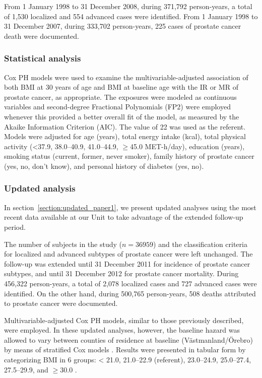 From 1 January 1998 to 31 December 2008, during 371,792 person-years, a total of 1,530 localized and 554 advanced cases were identified. From 1 January 1998 to 31 December 2007, during 333,702 person-years, 225 cases of prostate cancer death were documented.

\subsubsection{Statistical analysis}

Cox PH models were used to examine the multivariable-adjusted association of both BMI at 30 years of age and BMI at baseline age with the IR or MR of prostate cancer, as appropriate. The exposures were modeled as continuous variables and second-degree Fractional Polynomials (FP2) \citep{royston_use_1999} were employed whenever this provided a better overall fit of the model, as measured by the Akaike Information Criterion (AIC). The value of 22 \kgmsq{} was used as the referent. Models were adjusted for age (years), total energy intake (kcal), total physical activity (<37.9, 38.0--40.9, 41.0--44.9, $\ge$45.0 MET-h/day), education (years), smoking status (current, former, never smoker), family history of prostate cancer (yes, no, don't know), and personal history of diabetes (yes, no).

\subsubsection{Updated analysis}

In section~\ref{section:updated_paper1}, we present updated analyses using the most recent data available at our Unit to take advantage of the extended follow-up period.  

The number of subjects in the study ($n=36959$) and the classification criteria for localized and advanced subtypes of prostate cancer were left unchanged. The follow-up was extended until 31 December 2011 for incidence of prostate cancer subtypes, and until 31 December 2012 for prostate cancer mortality. During 456,322 person-years, a total of 2,078 localized cases and 727 advanced cases were identified. On the other hand, during 500,765 person-years, 508 deaths attributed to prostate cancer were documented. 

Multivariable-adjusted Cox PH models, similar to those previously described, were employed. In these updated analyses, however, the baseline hazard was allowed to vary between counties of residence at baseline (Västmanland/Örebro) by means of stratified Cox models \citep{vanhouwelingen_cox_2013}. Results were presented in tabular form by categorizing BMI in 6 groups: < 21.0, 21.0--22.9 (referent), 23.0--24.9, 25.0--27.4, 27.5--29.9, and $\ge 30.0$ \kgmsq{}. 

